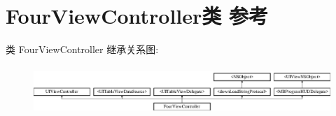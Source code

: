 \hypertarget{interface_four_view_controller}{\section{Four\-View\-Controller类 参考}
\label{interface_four_view_controller}
}
类 Four\-View\-Controller 继承关系图\-:\begin{figure}[H]
\begin{center}
\leavevmode
\includegraphics[height=1.866667cm]{interface_four_view_controller}
\end{center}
\end{figure}
